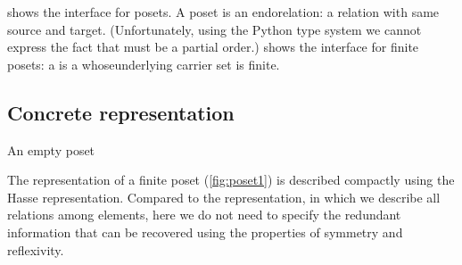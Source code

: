 
 shows the interface for posets.
A poset is an endorelation: a relation with same source and target.
(Unfortunately, using the Python type system we cannot express the fact that  must be a partial order.)
 shows the interface for finite posets:
a  is a  whoseunderlying carrier set is finite.




\begin{figure}[h!]
    \caption{}
    \label{fig:poset-finiteposet}
\end{figure}

\subsection{Concrete representation}
\begin{marginfigure}
    \caption{}
    \label{fig:poset1}
\end{marginfigure}
\begin{marginfigure}
    \caption{An empty poset}
    \label{fig:poset_empty}
\end{marginfigure}

The representation of a finite poset (\cref{fig:poset1}) is described compactly using the Hasse representation.
Compared to the  representation, in which we describe all relations among elements, here we do not need to specify the redundant information that can be recovered using the properties of symmetry and reflexivity.


